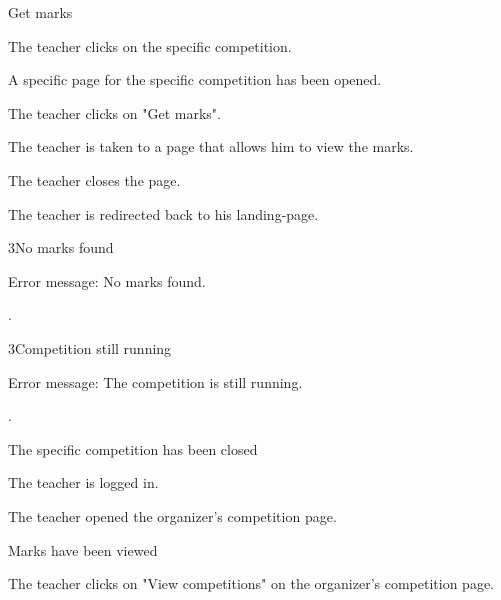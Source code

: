 \begin{uc}{Get marks}

    \begin{uc-mss}
    \item The teacher clicks on the specific competition.
    \item A specific page for the specific competition has been opened.
    \item The teacher clicks on "Get marks".
    \item The teacher is taken to a page that allows him to view the marks.
    \item The teacher closes the page.
    \item The teacher is redirected back to his landing-page.
    \end{uc-mss}

    \begin{uc-ext}
        \begin{uc-fail}{3}{No marks found}
        \item Error message: No marks found.
        \item {}.
        \end{uc-fail}
	
	\begin{uc-fail}{3}{Competition still running}
	\item Error message: The competition is still running.
	\item {}.
	\end{uc-fail}
    \end{uc-ext}

    \begin{uc-pre}
	\item The specific competition has been closed
    	\item The teacher is logged in.
    	\item The teacher opened the organizer's competition page.
    \end{uc-pre}

    \begin{uc-post}
    \item Marks have been viewed
    \end{uc-post}

    \begin{uc-trig}
        The teacher clicks on "View competitions" on the organizer's competition page.
    \end{uc-trig}

\end{uc}
